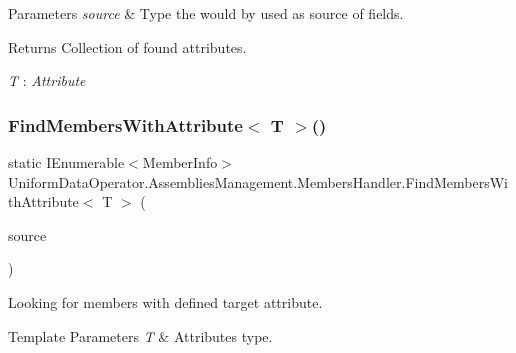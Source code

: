 \begin{DoxyParams}{Parameters}
{\em source} & Type the would by used as source of fields.\\
\hline
\end{DoxyParams}
\begin{DoxyReturn}{Returns}
Collection of found attributes.
\end{DoxyReturn}
\begin{Desc}
\item[Type Constraints]\begin{description}
\item[{\em T} : {\em Attribute}]\end{description}
\end{Desc}
\mbox{\label{class_uniform_data_operator_1_1_assemblies_management_1_1_members_handler_ad5add0d63eb8e0f8dac0e48be98032ae}} 
\subsubsection{\texorpdfstring{Find\+Members\+With\+Attribute$<$ T $>$()}{FindMembersWithAttribute< T >()}\hspace{0.1cm}{\footnotesize\ttfamily [2/2]}}
{\footnotesize\ttfamily static I\+Enumerable$<$Member\+Info$>$ Uniform\+Data\+Operator.\+Assemblies\+Management.\+Members\+Handler.\+Find\+Members\+With\+Attribute$<$ T $>$ (\begin{DoxyParamCaption}\item[{I\+Enumerable$<$ Member\+Info $>$}]{source }\end{DoxyParamCaption})\hspace{0.3cm}{\ttfamily [static]}}



Looking for members with defined target attribute. 


\begin{DoxyTemplParams}{Template Parameters}
{\em T} & Attribute\textquotesingle{}s type.\\
\hline
\end{DoxyTemplParams}

